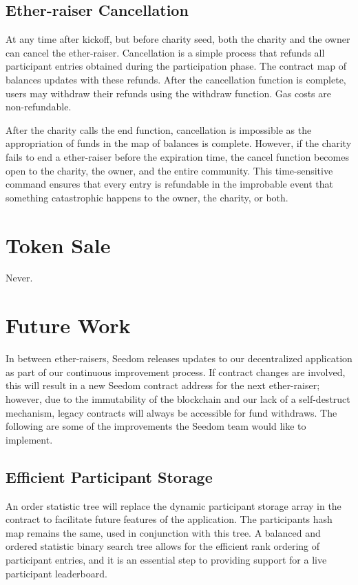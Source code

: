 \documentclass[11pt]{article}
\begin{document}
\subsection{Ether-raiser Cancellation}

At any time after kickoff, but before charity seed, both the charity and the owner can cancel the ether-raiser. Cancellation is a simple process that refunds all participant entries obtained during the participation phase. The contract map of balances updates with these refunds. After the cancellation function is complete, users may withdraw their refunds using the withdraw function. Gas costs are non-refundable.

After the charity calls the end function, cancellation is impossible as the appropriation of funds in the map of balances is complete. However, if the charity fails to end a ether-raiser before the expiration time, the cancel function becomes open to the charity, the owner, and the entire community. This time-sensitive command ensures that every entry is refundable in the improbable event that something catastrophic happens to the owner, the charity, or both.

\section{Token Sale}
Never.

\section{Future Work}

In between ether-raisers, Seedom releases updates to our decentralized application as part of our continuous improvement process. If contract changes are involved, this will result in a new Seedom contract address for the next ether-raiser; however, due to the immutability of the blockchain and our lack of a self-destruct mechanism, legacy contracts will always be accessible for fund withdraws. The following are some of the improvements the Seedom team would like to implement.

\subsection{Efficient Participant Storage}

An order statistic tree \cite{5} will replace the dynamic participant storage array in the contract to facilitate future features of the application. The participants hash map remains the same, used in conjunction with this tree. A balanced and ordered statistic binary search tree allows for the efficient rank ordering of participant entries, and it is an essential step to providing support for a live participant leaderboard.
\end{document}
